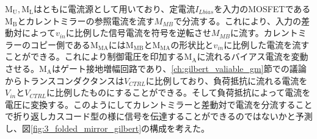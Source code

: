         $\mathrm{M_{U},M_{L}}$はともに電流源として用いており、定電流$I_{Lbias}$を入力のMOSFETである$\mathrm{M_{B}}$とカレントミラーの参照電流を流す$M_{MB}$で分流する。これにより、入力の差動対によって$v_{in}$に比例した信号電流を符号を逆転させ$M_{MB}$に流す。カレントミラーのコピー側である$\mathrm{M_{MA}}$には$\mathrm{M_{MB}}$と$\mathrm{M_{MA}}$の形状比と$v_{in}$に比例した電流を流すことができる。これにより制御電圧を印加する$\mathrm{M_{A}}$に流れるバイアス電流を変動させる。$\mathrm{M_{A}}$はゲート接地増幅回路であり、\ref{ch:gilbert_valiable_gm}節での議論からトランスコンダクタンスは$V_{CTRL}$に比例しており、負荷抵抗に流れる電流を$V_{in}$と$V_{CTRL}$に比例したものにすることができる。そして負荷抵抗によって電流を電圧に変換する。このようにしてカレントミラーと差動対で電流を分流することで折り返しカスコード型の様に信号を伝達することができるのではないかと予測し、図\ref{fig:3_folded_mirror_gilbert}の構成を考えた。


